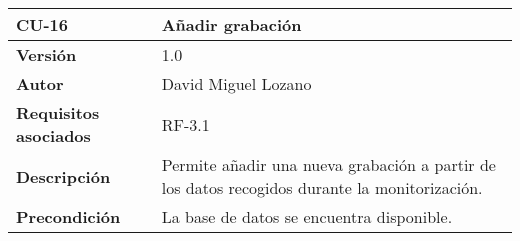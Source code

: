 \begin{longtable}[H]{@{}ll@{}}
\toprule
\begin{minipage}[b]{0.26\columnwidth}\raggedright\strut
\textbf{CU-16}\strut
\end{minipage} & \begin{minipage}[b]{0.68\columnwidth}\raggedright\strut
\textbf{Añadir grabación}\strut
\end{minipage}\tabularnewline
\midrule
\endhead
\begin{minipage}[t]{0.26\columnwidth}\raggedright\strut
\textbf{Versión}\strut
\end{minipage} & \begin{minipage}[t]{0.68\columnwidth}\raggedright\strut
1.0\strut
\end{minipage}\tabularnewline
\begin{minipage}[t]{0.26\columnwidth}\raggedright\strut
\textbf{Autor}\strut
\end{minipage} & \begin{minipage}[t]{0.68\columnwidth}\raggedright\strut
David Miguel Lozano\strut
\end{minipage}\tabularnewline
\begin{minipage}[t]{0.26\columnwidth}\raggedright\strut
\textbf{Requisitos asociados}\strut
\end{minipage} & \begin{minipage}[t]{0.68\columnwidth}\raggedright\strut
RF-3.1\strut
\end{minipage}\tabularnewline
\begin{minipage}[t]{0.26\columnwidth}\raggedright\strut
\textbf{Descripción}\strut
\end{minipage} & \begin{minipage}[t]{0.68\columnwidth}\raggedright\strut
Permite añadir una nueva grabación a partir de los datos recogidos
durante la monitorización.\strut
\end{minipage}\tabularnewline
\begin{minipage}[t]{0.26\columnwidth}\raggedright\strut
\textbf{Precondición}\strut
\end{minipage} & \begin{minipage}[t]{0.68\columnwidth}\raggedright\strut
La base de datos se encuentra disponible.


\end{minipage}
\end{longtable}
